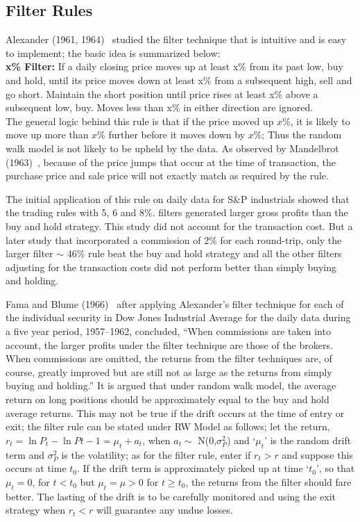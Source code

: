 \subsection{Filter Rules}


Alexander (1961, 1964)~\cite{} studied the filter technique that is intuitive and is easy to implement; the basic idea is summarized below: \\


\noindent \textbf{x\% Filter:} If a daily closing price moves up at least x\% from its past low, buy and hold, until its price moves down at least x\% from a subsequent high, sell and go short. Maintain the short position until price rises at least x\% above a subsequent low, buy. Moves less than x\% in either direction are ignored. \\


The general logic behind this rule is that if the price moved up $x$\%, it is likely to move up more than $x$\% further before it moves down by $x$\%; Thus the random walk model is not likely to be upheld by the data. As observed by Mandelbrot (1963)~\cite{}, because of the price jumps that occur at the time of transaction, the purchase price and sale price will not exactly match as required by the rule.


The initial application of this rule on daily data for S\&P industrials showed that the trading rules with 5, 6 and 8\%. filters generated larger gross profits than the buy and hold strategy. This study did not account for the transaction cost. But a later study that incorporated a commission of 2\% for each round-trip, only the larger filter  $\sim$ 46\% rule beat the buy and hold strategy and all the other filters adjusting for the transaction costs did not perform better than simply buying and holding.


Fama and Blume (1966)~\cite{famablume} after applying Alexander's filter technique for each of the individual security in Dow Jones Industrial Average for the daily data during a five year period, 1957--1962, concluded, ``When commissions are taken into account, the larger profits under the filter technique are those of the brokers. When commissions are omitted, the returns from the filter techniques are, of course, greatly improved but are still not as large as the returns from simply buying and holding.'' It is argued that under random walk model, the average return on long positions should be approximately equal to the buy and hold average returns. This may not be true if the drift occurs at the time of entry or exit; the filter rule can be stated under RW Model as follows; let the return, $r_{t} = \ln{P_{t}} - \ln{P{t-1}} = \mu_{t} + a_{t}$, when $a_{t} \sim$ N(0,$\sigma_{P}^2$) and `$\mu_{t}$' is the random drift term and $\sigma_{P}^2$ is the volatility; as for the filter rule, enter if $r_{t} > r$ and suppose this occurs at time $t_{0}$. If the drift term is approximately picked up at time `$t_{0}$', so that $\mu_{t} = 0$, for $t < t_{0}$ but $\mu_{t} = \mu > 0$ for $t \geq t_{0}$, the returns from the filter should fare better. The lasting of the drift is to be carefully monitored and using the exit strategy when $r_{t} < r$ will guarantee any undue losses.



